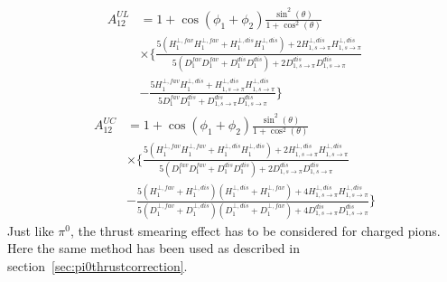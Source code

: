 \begin{equation}
\begin{aligned}
A^{UL}_{12}&=1+\cos(\phi_1+\phi_2)\frac{\sin^2(\theta)}{1+\cos^2(\theta)}\\
&\times\bigg\{\frac{5(H^{\bot,fav}_1H^{\bot,fav}_1+H^{\bot,dis}_1H^{\bot,dis}_1)+2H^{\bot,dis}_{1,s\rightarrow\pi}H^{\bot,dis}_{1,s\rightarrow\pi}}{5(D^{fav}_1D^{fav}_1+D^{dis}_1 D^{dis}_1)+2D^{dis}_{1,s\rightarrow\pi}D^{dis}_{1,s\rightarrow\pi}}\\
&-\frac{5H^{\bot,fav}_1 H^{\bot,dis}_1+H^{\bot,dis}_{1,s\rightarrow\pi}H^{\bot,dis}_{1,s\rightarrow\pi}}{5D^{fav}_1D^{dis}_1 +D^{dis}_{1,s\rightarrow\pi}D^{dis}_{1,s\rightarrow\pi}} \bigg\} 
\end{aligned}
\label{eqn:allratiosexpress2}
\end{equation}
\begin{equation}
\begin{aligned}
A^{UC}_{12}&=1+\cos(\phi_1+\phi_2)\frac{\sin^2(\theta)}{1+\cos^2(\theta)}\\
&\times\bigg\{\frac{5(H^{\bot,fav}_1H^{\bot,fav}_1+H^{\bot,dis}_1H^{\bot,dis}_1)+2H^{\bot,dis}_{1,s\rightarrow\pi}H^{\bot,dis}_{1,s\rightarrow\pi}}{5(D^{fav}_1D^{fav}_1+D^{dis}_1D^{dis}_1)+2D^{dis}_{1,s\rightarrow\pi}D^{dis}_{1,s\rightarrow\pi}}\\
&-\frac{5(H^{\bot,fav}_1+H^{\bot,dis}_1)(H^{\bot,dis}_1+H^{\bot,fav}_1)+4H^{\bot,dis}_{1,s\rightarrow\pi}H^{\bot,dis}_{1,s\rightarrow\pi}}{5(D^{\bot,fav}_1+D^{\bot,dis}_1)(D^{\bot,dis}_1+D^{\bot,fav}_1)+4D^{dis}_{1,s\rightarrow\pi}D^{dis}_{1,s\rightarrow\pi}} \bigg\}
\end{aligned}
\label{eqn:allratiosexpress3}
\end{equation}
Just like $\pi^0$, the thrust smearing effect has to be considered for charged pions. Here the same method has been used as described in section~\ref{sec:pi0thrustcorrection}. 
\iffalse
